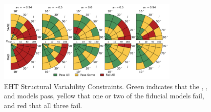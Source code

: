 \begin{figure}
  \centering
  \includegraphics[width=0.8\textwidth]{./figures/4Glam_Constraints.png}
  \caption{EHT Structural Variability Constraints.  Green indicates that the \kharma, \bhac, and \hamr models pass, yellow that one or two of the fiducial models fail, and red that all three fail.}
  \label{fig:ehtvar_pizza}
\end{figure}


\clearpage


%
%
%
%
%
%
%
%
%
%
%
%

\clearpage
